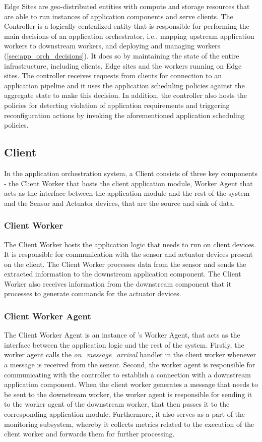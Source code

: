 \par Edge Sites are geo-distributed entities with compute and storage resources that are able to run instances of application components and serve clients. The Controller is a logically-centralized entity that is responsible for performing the main decisions of an application orchestrator, i.e., mapping upstream application workers to downstream workers, and deploying and managing workers (\cref{sec:app_orch_decisions}). It does so by maintaining the state of the entire infrastructure, including clients, Edge sites and the workers running on Edge sites. The controller receives requests from clients for connection to an application pipeline and it uses the application scheduling policies against the aggregate state to make this decision. In addition, the controller also hosts the policies for detecting violation of application requirements and triggering reconfiguration actions by invoking the aforementioned application scheduling policies.

\subsection{Client}
In the \oneedge{} application orchestration system, a Client consists of three key components - the Client Worker that hosts the client application module, Worker Agent that acts as the interface between the application module and the rest of the system and the Sensor and Actuator devices, that are the source and sink of data.

\subsubsection{Client Worker}
The Client Worker hosts the application logic that needs to run on client devices. It is responsible for communication with the sensor and actuator devices present on the client. The Client Worker processes data from the sensor and sends the extracted information to the downstream application component. The Client Worker also receives information from the downstream component that it processes to generate commands for the actuator devices.

\subsubsection{Client Worker Agent}
The Client Worker Agent is an instance of \oneedge's Worker Agent, that acts as the interface between the application logic and the rest of the system. Firstly, the worker agent calls the \textit{on\_message\_arrival} handler in the client worker whenever a message is received from the sensor. Second, the worker agent is responsible for communicating with the controller to establish a connection with a downstream application component. When the client worker generates a message that needs to be sent to the downstream worker, the worker agent is responsible for sending it to the worker agent of the downstream worker, that then passes it to the corresponding application module. Furthermore, it also serves as a part of the monitoring subsystem, whereby it collects metrics related to the execution of the client worker and forwards them for further processing.


